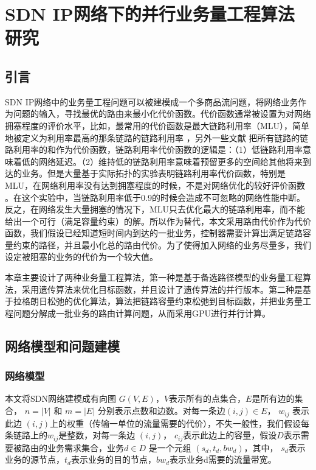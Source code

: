 \chapter{SDN IP网络下的并行业务量工程算法研究}
\section{引言}
SDN IP网络中的业务量工程问题可以被建模成一个多商品流问题，将网络业务作为问题的输入，寻找最优的路由来最小化代价函数。代价函数通常被设置为对网络拥塞程度的评价水平，比如，最常用的代价函数是最大链路利用率（MLU），简单地被定义为利用率最高的那条链路的链路利用率 ，另外一些文献 把所有链路的链路利用率的和作为代价函数，链路利用率代价函数的逻辑是：（1）低链路利用率意味着低的网络延迟。（2）维持低的链路利用率意味着预留更多的空间给其他将来到达的业务。但是大量基于实际拓扑的实验表明链路利用率代价函数，特别是MLU，在网络利用率没有达到拥塞程度的时候，不是对网络优化的较好评价函数 。在这个实验中，当链路利用率低于0.9的时候会造成不可忽略的网络性能中断。反之，在网络发生大量拥塞的情况下，MLU只去优化最大的链路利用率，而不能给出一个可行（满足容量约束）的解。所以作为替代，本文采用路由代价作为代价函数，我们假设已经知道短时间内到达的一批业务，控制器需要计算出满足链路容量约束的路径，并且最小化总的路由代价。为了使得加入网络的业务尽量多，我们设定被阻塞的业务的代价为一个较大值。

本章主要设计了两种业务量工程算法，第一种是基于备选路径模型的业务量工程算法，采用遗传算法来优化目标函数，并且设计了遗传算法的并行版本。第二种是基于拉格朗日松弛的优化算法，算法把链路容量约束松弛到目标函数，并把业务量工程问题分解成一批业务的路由计算问题，从而采用GPU进行并行计算。
\section{网络模型和问题建模}
\subsection{网络模型}

本文将SDN网络建模成有向图 $G(V, E)$，$V$表示所有的点集合，$E$是所有边的集合， $n = |V|$ 和 $m = |E|$ 分别表示点数和边数。对每一条边$(i,j)\in E$， $w_{ij}$ 表示此边 $(i,j)$上的权重（传输一单位的流量需要的代价），不失一般性，我们假设每条链路上的$w_{ij}$是整数，对每一条边 $(i,j)$， $c_{ij}$表示此边上的容量，假设$D$表示需要被路由的业务需求集合，业务$d \in D$ 是一个元组 $(s_d, t_d, bw_d)$，其中， $s_d$表示业务的源节点，$t_d$表示业务的目的节点，$bw_d$表示业务d需要的流量带宽。
